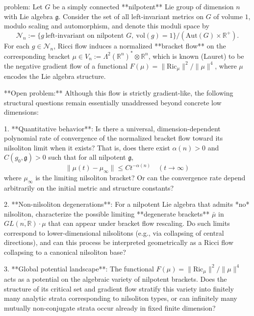 problem:  
Let \( G \) be a simply connected **nilpotent** Lie group of dimension \( n \) with Lie algebra \( \mathfrak{g} \). Consider the set of all left-invariant metrics on \( G \) of volume \(1\), modulo scaling and automorphism, and denote this moduli space by  
\[
\mathcal{N}_n := \{ g \ \text{left-invariant on nilpotent } G,\ \mathrm{vol}(g)=1 \}/(\mathrm{Aut}(G) \times \mathbb{R}^+).
\]
For each \( g\in \mathcal{N}_n\), Ricci flow induces a normalized **bracket flow** on the corresponding bracket \( \mu \in V_n := \Lambda^2(\mathbb{R}^n)^* \otimes \mathbb{R}^n \), which is known (Lauret) to be the negative gradient flow of a functional \( F(\mu) = \|\mathrm{Ric}_\mu\|^2 / \|\mu\|^4 \), where \( \mu \) encodes the Lie algebra structure.

**Open problem:**  
Although this flow is strictly gradient-like, the following structural questions remain essentially unaddressed beyond concrete low dimensions:

1. **Quantitative behavior**: Is there a universal, dimension-dependent polynomial rate of convergence of the normalized bracket flow toward its nilsoliton limit when it exists? That is, does there exist \(\alpha(n)>0\) and \(C(g_0,\mathfrak{g})>0\) such that for all nilpotent \(\mathfrak{g}\),  
   \[
   \|\mu(t)-\mu_\infty\| \leq C t^{-\alpha(n)} \quad (t\to\infty)
   \]
   where \(\mu_\infty\) is the limiting nilsoliton bracket?  Or can the convergence rate depend arbitrarily on the initial metric and structure constants?

2. **Non-nilsoliton degenerations**: For a nilpotent Lie algebra that admits *no* nilsoliton, characterize the possible limiting **degenerate brackets** \(\bar{\mu}\) in \(\overline{GL(n,\mathbb{R})\cdot\mu}\) that can appear under bracket flow rescaling. Do such limits correspond to lower-dimensional nilsolitons (e.g., via collapsing of central directions), and can this process be interpreted geometrically as a Ricci flow collapsing to a canonical nilsoliton base?

3. **Global potential landscape**: The functional \(F(\mu)=\|\mathrm{Ric}_\mu\|^2/\|\mu\|^4\) acts as a potential on the algebraic variety of nilpotent brackets.  Does the structure of its critical set and gradient flow stratify this variety into finitely many analytic strata corresponding to nilsoliton types, or can infinitely many mutually non-conjugate strata occur already in fixed finite dimension?

